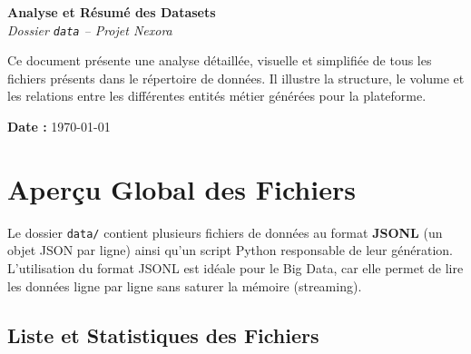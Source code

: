 \documentclass[12pt,a4paper]{article}
\begin{document}
\begin{titlepage}
    \centering
    \vspace*{2cm}
    
    {\Huge \bfseries \color{primary} Analyse et Résumé des Datasets}\\[1cm]
    {\Large \textit{Dossier \texttt{data} -- Projet Nexora}}\\[2cm]
    
    
    \vspace{2cm}
    
    Ce document présente une analyse détaillée, visuelle et simplifiée de tous les fichiers présents dans le répertoire de données. Il illustre la structure, le volume et les relations entre les différentes entités métier générées pour la plateforme.
    
    \vfill
    {\large \textbf{Date :} \today}
\end{titlepage}

\tableofcontents
\newpage

\section{Aperçu Global des Fichiers}

Le dossier \texttt{data/} contient plusieurs fichiers de données au format \textbf{JSONL} (un objet JSON par ligne) ainsi qu'un script Python responsable de leur génération. L'utilisation du format JSONL est idéale pour le Big Data, car elle permet de lire les données ligne par ligne sans saturer la mémoire (streaming).

\subsection{Liste et Statistiques des Fichiers}
\end{document}
